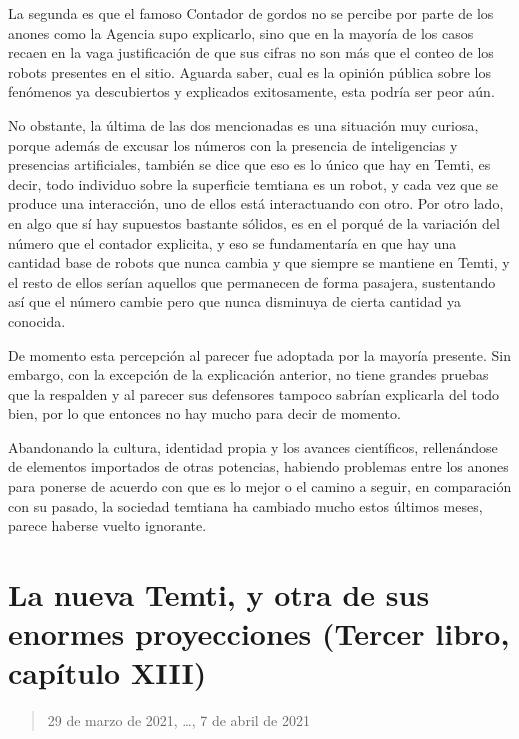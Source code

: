 \documentclass[
]{book}
\begin{document}
La segunda es que el famoso Contador de gordos no se percibe por parte de los anones como la Agencia supo explicarlo, sino que en la mayoría de los casos recaen en la vaga justificación de que sus cifras no son más que el conteo de los robots presentes en el sitio. Aguarda saber, cual es la opinión pública sobre los fenómenos ya descubiertos y explicados exitosamente, esta podría ser peor aún.

No obstante, la última de las dos mencionadas es una situación muy curiosa, porque además de excusar los números con la presencia de inteligencias y presencias artificiales, también se dice que eso es lo único que hay en Temti, es decir, todo individuo sobre la superficie temtiana es un robot, y cada vez que se produce una interacción, uno de ellos está interactuando con otro. Por otro lado, en algo que sí hay supuestos bastante sólidos, es en el porqué de la variación del número que el contador explicita, y eso se fundamentaría en que hay una cantidad base de robots que nunca cambia y que siempre se mantiene en Temti, y el resto de ellos serían aquellos que permanecen de forma pasajera, sustentando así que el número cambie pero que nunca disminuya de cierta cantidad ya conocida.

De momento esta percepción al parecer fue adoptada por la mayoría presente. Sin embargo, con la excepción de la explicación anterior, no tiene grandes pruebas que la respalden y al parecer sus defensores tampoco sabrían explicarla del todo bien, por lo que entonces no hay mucho para decir de momento.

Abandonando la cultura, identidad propia y los avances científicos, rellenándose de elementos importados de otras potencias, habiendo problemas entre los anones para ponerse de acuerdo con que es lo mejor o el camino a seguir, en comparación con su pasado, la sociedad temtiana ha cambiado mucho estos últimos meses, parece haberse vuelto ignorante.

\hypertarget{la-nueva-temti-y-otra-de-sus-enormes-proyecciones-tercer-libro-capuxedtulo-xiii}{%
\section{La nueva Temti, y otra de sus enormes proyecciones (Tercer libro, capítulo XIII)}\label{la-nueva-temti-y-otra-de-sus-enormes-proyecciones-tercer-libro-capuxedtulo-xiii}}

\begin{quote}
29 de marzo de 2021, \ldots, 7 de abril de 2021
\end{quote}
\end{document}
